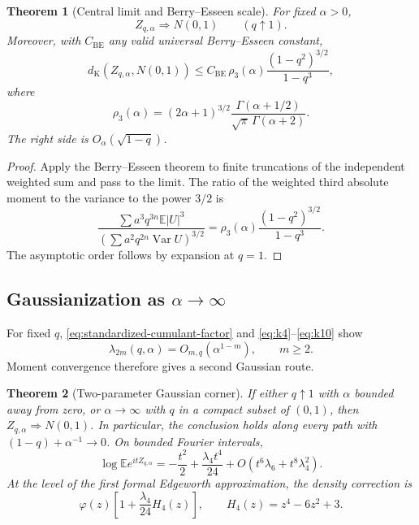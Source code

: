 \documentclass[11pt]{article}
\newtheorem{theorem}{Theorem}[section]
\theoremstyle{definition}
\theoremstyle{remark}
\newcommand{\E}{\mathbb{E}}
\newcommand{\Var}{\operatorname{Var}}
\begin{document}
\begin{theorem}[Central limit and Berry--Esseen scale]
\label{thm:CLT-q}
For fixed \(\alpha>0\),
\begin{equation}
 Z_{q,\alpha}\Rightarrow N(0,1)\qquad(q\uparrow1).
 \label{eq:q-CLT}
\end{equation}
Moreover, with \(C_{\mathrm{BE}}\) any valid universal Berry--Esseen constant,
\begin{equation}
 d_{\mathrm K}(Z_{q,\alpha},N(0,1))
 \le C_{\mathrm{BE}}\,
 \rho_3(\alpha)\frac{(1-q^2)^{3/2}}{1-q^3},
 \label{eq:berry-esseen}
\end{equation}
where
\begin{equation}
 \rho_3(\alpha)
 =(2\alpha+1)^{3/2}
 \frac{\Gamma(\alpha+1/2)}{\sqrt\pi\,\Gamma(\alpha+2)}.
 \label{eq:rho3}
\end{equation}
The right side is \(O_\alpha(\sqrt{1-q})\).
\end{theorem}

\begin{proof}
Apply the Berry--Esseen theorem \cite{Petrov,BhattacharyaRao} to finite truncations of the independent weighted sum and
pass to the limit.  The ratio of the weighted third absolute moment to the
variance to the power \(3/2\) is
\[
 \frac{\sum a^3q^{3n}\E|U|^3}
 {\left(\sum a^2q^{2n}\Var U\right)^{3/2}}
 =\rho_3(\alpha)\frac{(1-q^2)^{3/2}}{1-q^3}.
\]
The asymptotic order follows by expansion at \(q=1\).
\end{proof}

\subsection{Gaussianization as \(\alpha\to\infty\)}

For fixed \(q\), \eqref{eq:standardized-cumulant-factor} and
\eqref{eq:k4}--\eqref{eq:k10} show
\begin{equation}
 \lambda_{2m}(q,\alpha)=O_{m,q}(\alpha^{1-m}),\qquad m\ge2.
 \label{eq:alpha-cumulant-decay}
\end{equation}
Moment convergence therefore gives a second Gaussian route.

\begin{theorem}[Two-parameter Gaussian corner]
\label{thm:two-parameter-gaussian}
If either \(q\uparrow1\) with \(\alpha\) bounded away from zero, or
\(\alpha\to\infty\) with \(q\) in a compact subset of \((0,1)\), then
\(Z_{q,\alpha}\Rightarrow N(0,1)\).  In particular, the conclusion holds
along every path with \((1-q)+\alpha^{-1}\to0\).  On bounded Fourier
intervals,
\begin{equation}
 \log\E e^{itZ_{q,\alpha}}
 =-\frac{t^2}{2}+\frac{\lambda_4t^4}{24}+O(t^6\lambda_6+t^8\lambda_4^2).
 \label{eq:mod-gaussian}
\end{equation}
At the level of the first formal Edgeworth approximation, the density correction is
\begin{equation}
 \varphi(z)\left[1+\frac{\lambda_4}{24}H_4(z)\right],
 \qquad H_4(z)=z^4-6z^2+3.
 \label{eq:edgeworth}
\end{equation}
\end{theorem}
\end{document}
